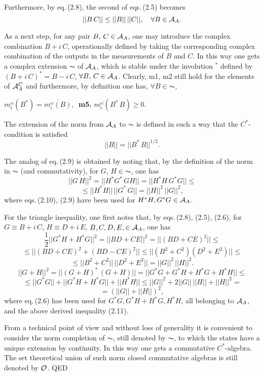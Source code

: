 \documentclass[12pt]{article}
\def \be {\begin{equation}}
\def \ee {\end{equation}}
\def \ume {{\scriptstyle{\frac{1}{2}}}}
\def \eqq {\equiv}
\def \om {{\omega}}
\def \A {{\cal A}}
\def \O {{\cal O}}
\begin{document}
\noindent Furthermore, by eq.\,(2.8), the second of eqs.\,(2.5) becomes 
\be{|| B \, C  || \leq || B ||\, || C ||,\,\,\,\,\,\,\forall B \in \A_A.}\ee

\noindent As a next step,  for any pair  $B, \,C \in \A_A$, one may introduce the complex combination $B + i \,C$, operationally defined by taking the corresponding complex combination of the outputs in the measurements of $B$ and $C$. 
In this way one gets a complex extension $\AC$ of $\A_A$, which is stable under the involution $^*$ defined by $(B + i \,C)^* = B - i \,C$, $ \forall B, \,C \in \A_A$.  
\noindent Clearly, m1, m2 still hold for the elements of $\A_A^C$ and furthermore, by definition one has, $\forall B \in \AC$, 

 $m^\om_i(B^*) = \overline{m^\om_i(B)}$,\,\,
{\bf m5.} $m^\om_i(B^*\, B) \geq 0.$    

\noindent The   extension of the norm from $\A_A$ to $\AC$ is defined in such a way that the $C^*$-condition is satisfied  
 \be{ || B || = || B^* \,B ||^{1/2}.  }\ee 

\noindent The analog of eq.\,(2.9) is obtained by noting that, by the definition of the norm in $\AC $ (and commutativity),  for $G, \,H \in \AC$, one has $$ || G\, H ||^2  =  || H^* G^*\,G H || = || H^* H \, G^* G || \leq $$  $$\leq || H^* H||\, || G^* \,G|| = || H ||^2 \,|| G ||^2, $$ where eqs.\,(2.10), (2.9)  have  been used for  $H^* H, G^* G \in \A_A$.

\noindent For the triangle inequality, one first notes that, by eqs.\,(2.8), (2.5), (2.6), for $ G \eqq  B + i \,C$, $H \eqq D + i \,E$, $B, C, D, E, \in \A_A$, one has  $$ \ume || G^* H + H^* G ||^2 =  || B D + C E ||^2  = || (B D + C E)^2 || \leq $$ $$ \leq || (B D + C E)^2 + (B D - C E)^2 || \leq  || (B^2 + C^2) (D^2 + E^2) || \leq $$ \be{ \leq  || B^2 + C^2 || \, || D^2 + E^2 || =   || G ||^2 \,|| H ||^2.}\ee  
$$|| G + H ||^2 = || (G + H)^* \,(G + H) || = || G^* G  +  G^* H + H^* G + H^* H || \leq $$
$$ \leq || G^* G || + || G^* H + H^* G || + || H^* H || \leq || G ||^2  + 2 || G ||\, || H || + || H ||^2 =  $$ 
$$ = ( || G || + || H ||)^2, $$
where  eq.\,(2.6) has been used for $G^* G,   G^* H + H^* G,   H^* H$, all belonging to $ \A_A$, and the above derived inequality (2.11). 


\noindent  From a technical point of view and without loss of generality it is  convenient to consider the norm completion of $\AC$, still denoted by $\AC$, to which the states have a unique extension by continuity. In this way one gets a commutative    $C^*$-algebra. The set theoretical union of such norm closed commutative algebras is still denoted by $\O$.
 QED
\end{document}
